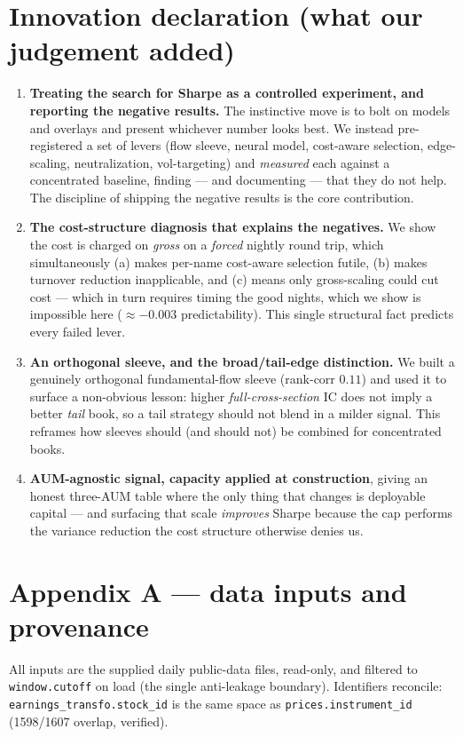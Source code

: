 \documentclass[11pt,a4paper]{article}
\newcommand{\code}[1]{\texttt{#1}}
\newcommand{\sleeveCorr}{0.11}
\newcommand{\edgeCorr}{-0.003}            %
\begin{document}
\section{Innovation declaration (what our judgement added)}
\begin{enumerate}
\item \textbf{Treating the search for Sharpe as a controlled experiment, and reporting the negative results.}
The instinctive move is to bolt on models and overlays and present whichever number looks best. We instead
pre-registered a set of levers (flow sleeve, neural model, cost-aware selection, edge-scaling, neutralization,
vol-targeting) and \emph{measured} each against a concentrated baseline, finding --- and documenting --- that
they do not help. The discipline of shipping the negative results is the core contribution.
\item \textbf{The cost-structure diagnosis that explains the negatives.} We show the cost is charged on
\emph{gross} on a \emph{forced} nightly round trip, which simultaneously (a) makes per-name cost-aware selection
futile, (b) makes turnover reduction inapplicable, and (c) means only gross-scaling could cut cost --- which in
turn requires timing the good nights, which we show is impossible here ($\approx\edgeCorr$ predictability).
This single structural fact predicts every failed lever.
\item \textbf{An orthogonal sleeve, and the broad/tail-edge distinction.} We built a genuinely orthogonal
fundamental-flow sleeve (rank-corr $\sleeveCorr$) and used it to surface a non-obvious lesson: higher
\emph{full-cross-section} IC does not imply a better \emph{tail} book, so a tail strategy should not blend in a
milder signal. This reframes how sleeves should (and should not) be combined for concentrated books.
\item \textbf{AUM-agnostic signal, capacity applied at construction}, giving an honest three-AUM table where
the only thing that changes is deployable capital --- and surfacing that scale \emph{improves} Sharpe because
the cap performs the variance reduction the cost structure otherwise denies us.
\end{enumerate}

\section*{Appendix A --- data inputs and provenance}
All inputs are the supplied daily public-data files, read-only, and filtered to \code{window.cutoff} on load
(the single anti-leakage boundary). Identifiers reconcile: \code{earnings\_transfo.stock\_id} is the same space
as \code{prices.instrument\_id} (1598/1607 overlap, verified).
\end{document}
